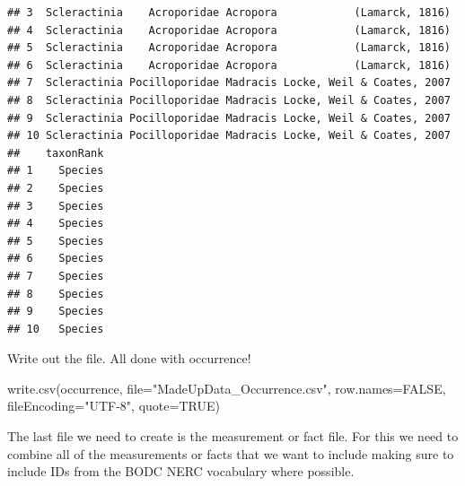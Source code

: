 \documentclass[
]{book}
\newenvironment{Shaded}{\begin{snugshade}}{\end{snugshade}}
\newcommand{\AttributeTok}[1]{\textcolor[rgb]{0.77,0.63,0.00}{#1}}
\newcommand{\ConstantTok}[1]{\textcolor[rgb]{0.00,0.00,0.00}{#1}}
\newcommand{\FunctionTok}[1]{\textcolor[rgb]{0.00,0.00,0.00}{#1}}
\newcommand{\NormalTok}[1]{#1}
\newcommand{\StringTok}[1]{\textcolor[rgb]{0.31,0.60,0.02}{#1}}
\begin{document}
\begin{verbatim}
## 3  Scleractinia    Acroporidae Acropora            (Lamarck, 1816)
## 4  Scleractinia    Acroporidae Acropora            (Lamarck, 1816)
## 5  Scleractinia    Acroporidae Acropora            (Lamarck, 1816)
## 6  Scleractinia    Acroporidae Acropora            (Lamarck, 1816)
## 7  Scleractinia Pocilloporidae Madracis Locke, Weil & Coates, 2007
## 8  Scleractinia Pocilloporidae Madracis Locke, Weil & Coates, 2007
## 9  Scleractinia Pocilloporidae Madracis Locke, Weil & Coates, 2007
## 10 Scleractinia Pocilloporidae Madracis Locke, Weil & Coates, 2007
##    taxonRank
## 1    Species
## 2    Species
## 3    Species
## 4    Species
## 5    Species
## 6    Species
## 7    Species
## 8    Species
## 9    Species
## 10   Species
\end{verbatim}

Write out the file. All done with occurrence!

\begin{Shaded}
\begin{Highlighting}[]
\FunctionTok{write.csv}\NormalTok{(occurrence, }\AttributeTok{file=}\StringTok{"MadeUpData\_Occurrence.csv"}\NormalTok{, }\AttributeTok{row.names=}\ConstantTok{FALSE}\NormalTok{, }\AttributeTok{fileEncoding=}\StringTok{"UTF{-}8"}\NormalTok{, }\AttributeTok{quote=}\ConstantTok{TRUE}\NormalTok{)}
\end{Highlighting}
\end{Shaded}

The last file we need to create is the measurement or fact file. For this we need to
combine all of the measurements or facts that we want to include making sure to include
IDs from the BODC NERC vocabulary where possible.
\end{document}
